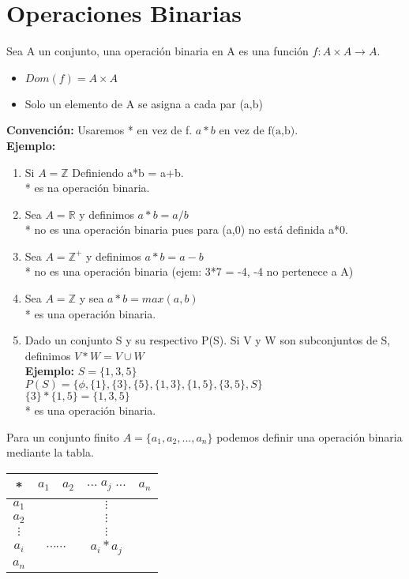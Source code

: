 \chapter{Operaciones Binarias}

Sea A un conjunto, una operación binaria en A es una función $f:A\times A \rightarrow A$.
\begin{itemize}
\item $Dom(f)=A\times A$
\item Solo un elemento de A se asigna a cada par (a,b)
\end{itemize}

\textbf{Convención: }Usaremos * en vez de f. $a*b \mbox{ en vez de f(a,b)}$.\\
\textbf{Ejemplo: }
\begin{enumerate}
\item Si $A=\mathds{Z}$ Definiendo a*b = a+b.\\
		* es na operación binaria.
\item Sea $A=\mathds{R}$ y definimos $a*b=a/b$\\
		* no es una operación binaria pues para (a,0) no está definida a*0.
\item Sea $A=\mathds{Z}^+$ y definimos $a*b=a-b$\\
		* no es una operación binaria (ejem: 3*7 = -4, -4 no pertenece a A)
\item Sea $A=\mathds{Z}$ y sea $a*b=max(a,b)$\\
		* es una operación binaria.
\item Dado un conjunto S y su respectivo P(S). Si V y W son subconjuntos de S, definimos $V*W=V\cup W$\\
		\textbf{Ejemplo: }$S=\lbrace 1,3,5\rbrace$\\
		$P(S)=\lbrace \phi,\lbrace 1\rbrace,\lbrace 3\rbrace,\lbrace 5\rbrace,\lbrace 1,3\rbrace,\lbrace 1,5\rbrace,\lbrace 3,5\rbrace, S\rbrace$\\
		$\lbrace 3\rbrace * \lbrace 1,5\rbrace =\lbrace 1,3,5\rbrace$\\
		* es una operación binaria.
\end{enumerate}

Para un conjunto finito $A=\lbrace a_1,a_2,...,a_n\rbrace$ podemos definir una operación binaria mediante la tabla.

\begin{center}
\begin{tabular}{c|ccc}
* & $a_1 \quad a_2$&$...\; a_j\; ...$&$a_n$\\ \hline
$a_1$ & &   $\vdots$&\\
$a_2$ &    &$\vdots$&\\
$\vdots$ &   &$\vdots$&\\
$a_i$ & $\cdots \cdots$& $a_i*a_j$&\\
$a_n$ & & &
\end{tabular}
\end{center}

